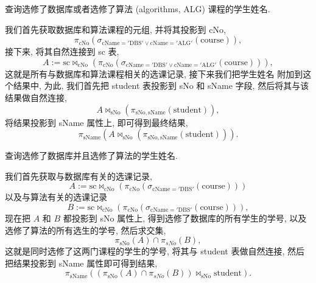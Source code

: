 \documentclass[10pt,UTF8]{book} %
\begin{document}
\begin{example}
    查询选修了数据库或者选修了算法 (algorithms, ALG) 课程的学生姓名.
    \begin{sol}
        我们首先获取数据库和算法课程的元组, 并将其投影到 cNo,
        \[ \pi_\mathrm{cNo} \left(
            \sigma_\mathrm{cName = 'DBS' \vee cName = 'ALG'} \left(
                \mathrm{course}
            \right)
        \right), \]
        接下来, 将其自然连接到 sc 表,
        \[ A := \mathrm{sc} \Join_\mathrm{cNo} \left(
            \pi_\mathrm{cNo} \left(
            \sigma_\mathrm{cName = 'DBS' \vee cName = 'ALG'} \left(
                \mathrm{course}
            \right)
        \right)
        \right), \]
        这就是所有与数据库和算法课程相关的选课记录, 接下来我们把学生姓名
        附加到这个结果中, 为此, 我们首先把 student 表投影到 sNo 和 sName 字段,
        然后将其与该结果做自然连接,
        \[ A \Join_\mathrm{sNo} \left(
            \pi_\mathrm{sNo, sName} (\mathrm{student})
        \right), \]
        将结果投影到 sName 属性上, 即可得到最终结果,
        \[ \pi_\mathrm{sName} \left(
            A \Join_\mathrm{sNo} \left(
            \pi_\mathrm{sNo, sName} (\mathrm{student})
        \right)
        \right). \]
    \end{sol}
\end{example}

\begin{example}
    查询选修了数据库并且选修了算法的学生姓名.
    \begin{sol}
        我们首先获取与数据库有关的选课记录,
        \[ A := \mathrm{sc} \Join_\mathrm{cNo} \left(
            \pi_\mathrm{cNo} \left(
            \sigma_\mathrm{cName = 'DBS'} \left(
                \mathrm{course}
            \right)
        \right)
        \right) \]
        以及与算法有关的选课记录
        \[ B := \mathrm{sc} \Join_\mathrm{cNo} \left(
            \pi_\mathrm{cNo} \left(
            \sigma_\mathrm{cName = 'DBS'} \left(
                \mathrm{course}
            \right)
        \right)
        \right), \]
        现在把 $A$ 和 $B$ 都投影到 sNo 属性上, 得到选修了数据库的所有学生的学号,
        以及选修了算法的所有选生的学号, 然后求交集,
        \[ \pi_\mathrm{sNo} \left( A \right)
        \cap \pi_{sNo} \left(B\right), \]
        这就是同时选修了这两门课程的学生的学号,
        将其与 student 表做自然连接, 然后把结果投影到 sName 属性即可得到结果,
        \[ \pi_\mathrm{sName} \left(
            (\pi_\mathrm{sNo} \left( A \right)
        \cap \pi_{sNo} \left(B\right))
        \Join_\mathrm{sNo} \mathrm{student}
        \right). \]
    \end{sol}
\end{example}
\end{document}
